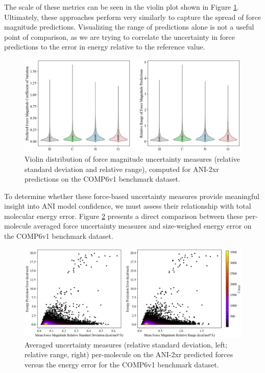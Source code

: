The scale of these metrics can be seen in the violin plot shown in Figure \ref{fig:2xr_comp6v1-force_uncertainty-violin}.
Ultimately, these approaches perform very similarly to capture the spread of force magnitude predictions.
Visualizing the range of predictions alone is not a useful point of comparison, as we are trying to correlate the uncertainty in force predictions to the error in energy relative to the reference value.

\begin{figure}[H]
    \centering
    \includegraphics[width=1\linewidth]{Images/2xr_forces/2xr_comp6v1_force-uncertainty_violin.png}
    \caption[Uncertainty in force magnitude predictions: violin distribution]{Violin distribution of force magnitude uncertainty measures (relative standard deviation and relative range), computed for ANI-2xr predictions on the COMP6v1 benchmark dataset.}
    \label{fig:2xr_comp6v1-force_uncertainty-violin}
\end{figure}

To determine whether these force-based uncertainty measures provide meaningful insight into ANI model confidence, we must assess their relationship with total molecular energy error. 
Figure \ref{fig:2xr_comp6v1-mean_force_uncertainty_hexbin} presents a direct comparison between these per-molecule averaged force uncertainty measures and size-weighed energy error on the COMP6v1 benchmark dataset. 

\begin{figure}[!ht]
    \centering
    \includegraphics[width=1\linewidth]{Images/2xr_forces/mean-uncertainty-vs-energy.png}
    \caption[Average force uncertainty measures per-molecule versus energy error (COMP6v1)]{Averaged uncertainty measures (relative standard deviation, left; relative range, right) per-molecule on the ANI-2xr predicted forces versus the energy error for the COMP6v1 benchmark dataset.}
    \label{fig:2xr_comp6v1-mean_force_uncertainty_hexbin}
\end{figure}

